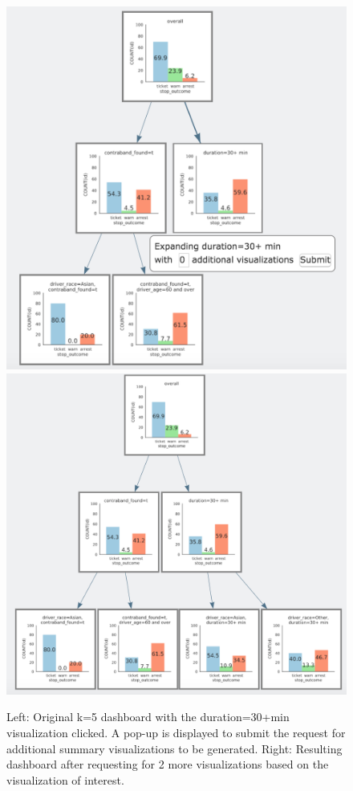 \begin{figure}[ht!]
\centering
\includegraphics[width=0.43\linewidth]{figures/before_expansion2.png}
\includegraphics[width=0.49\linewidth]{figures/after_expansion3.png}
\caption{Left: Original k=5 dashboard with the duration=30+min visualization clicked. A pop-up is displayed to submit the request for additional summary visualizations to be generated. Right: Resulting dashboard after requesting for 2 more visualizations based on the visualization of interest.}
\label{altroot_expansion}
\end{figure}

